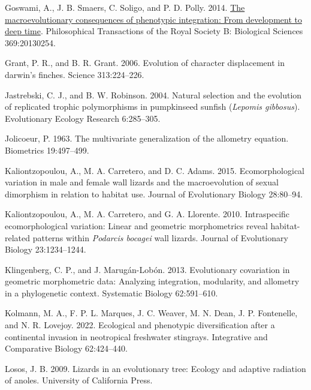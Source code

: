 \documentclass[
  11pt,
]{article}
\newlength{\cslhangindent}
\newlength{\cslentryspacingunit} %
\newenvironment{CSLReferences}[2] %
 {%
  \setlength{\parindent}{0pt}
  \ifodd #1
  \let\oldpar\par
  \def\par{\hangindent=\cslhangindent\oldpar}
  \fi
  \setlength{\parskip}{#2\cslentryspacingunit}
 }%
 {}
\begin{document}
\begin{CSLReferences}{1}{0}
\leavevmode{}%
Goswami, A., J. B. Smaers, C. Soligo, and P. D. Polly. 2014.
\href{https://doi.org/10.1098/rstb.2013.0254}{The macroevolutionary
consequences of phenotypic integration: From development to deep time}.
Philosophical Transactions of the Royal Society B: Biological Sciences
369:20130254.

\leavevmode{}%
Grant, P. R., and B. R. Grant. 2006. Evolution of character displacement
in darwin's finches. Science 313:224--226.

\leavevmode{}%
Jastrebski, C. J., and B. W. Robinson. 2004. Natural selection and the
evolution of replicated trophic polymorphisms in pumpkinseed sunfish
(\emph{{L}epomis gibbosus}). Evolutionary Ecology Research 6:285--305.

\leavevmode{}%
Jolicoeur, P. 1963. The multivariate generalization of the allometry
equation. Biometrics 19:497--499.

\leavevmode{}%
Kaliontzopoulou, A., M. A. Carretero, and D. C. Adams. 2015.
Ecomorphological variation in male and female wall lizards and the
macroevolution of sexual dimorphism in relation to habitat use. Journal
of Evolutionary Biology 28:80--94.

\leavevmode{}%
Kaliontzopoulou, A., M. A. Carretero, and G. A. Llorente. 2010.
Intraspecific ecomorphological variation: Linear and geometric
morphometrics reveal habitat-related patterns within \emph{{P}odarcis
bocagei} wall lizards. Journal of Evolutionary Biology 23:1234--1244.

\leavevmode{}%
Klingenberg, C. P., and J. Marugán-Lobón. 2013. Evolutionary covariation
in geometric morphometric data: Analyzing integration, modularity, and
allometry in a phylogenetic context. Systematic Biology 62:591--610.

\leavevmode{}%
Kolmann, M. A., F. P. L. Marques, J. C. Weaver, M. N. Dean, J. P.
Fontenelle, and N. R. Lovejoy. 2022. Ecological and phenotypic
diversification after a continental invasion in neotropical freshwater
stingrays. Integrative and Comparative Biology 62:424--440.

\leavevmode{}%
Losos, J. B. 2009. Lizards in an evolutionary tree: Ecology and adaptive
radiation of anoles. University of California Press.


\end{CSLReferences}
\end{document}
